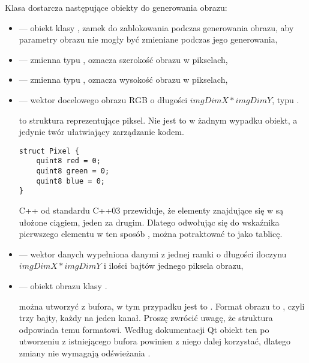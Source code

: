\label{sec:algorithm-pixmap-generate}

Klasa  dostarcza następujące obiekty do generowania obrazu:
\begin{itemize}
    \item {} --- obiekt klasy , zamek do zablokowania podczas generowania obrazu, aby parametry obrazu nie mogły być zmieniane podczas jego generowania,

    \item {} --- zmienna typu , oznacza szerokość obrazu w pikselach,

    \item {} --- zmienna typu , oznacza wysokość obrazu w pikselach,

    \item {} --- wektor docelowego obrazu RGB o długości $imgDimX*imgDimY$, typu .

           to struktura reprezentujące piksel.
          Nie jest to w żadnym wypadku obiekt, a jedynie twór ułatwiający zarządzanie kodem.
          \begin{lstlisting}
struct Pixel {
    quint8 red = 0;   
    quint8 green = 0;    
    quint8 blue = 0;   
}\end{lstlisting}

        \par
        C++ od standardu C++03 przewiduje, że elementy znajdujące się w  są ułożone ciągiem, jeden za drugim.
        Dlatego odwołując się do wskaźnika pierwszego elementu w ten sposób , można potraktować to jako tablicę.

    \item {} --- wektor danych wypełniona danymi z jednej ramki o długości iloczynu $imgDimX*imgDimY$ i ilości bajtów jednego piksela obrazu,

    \item {} --- obiekt obrazu klasy .

           można utworzyć z bufora, w tym przypadku jest to .
          Format obrazu to , czyli trzy bajty, każdy na jeden kanał.
          Proszę zwrócić uwagę, że struktura  odpowiada temu formatowi.
          Według dokumentacji Qt obiekt ten po utworzeniu z istniejącego bufora powinien z niego dalej korzystać, dlatego zmiany  nie wymagają odświeżania .


\end{itemize}
